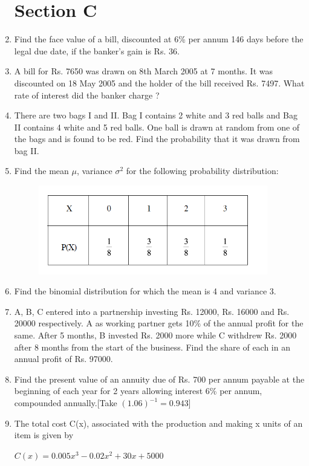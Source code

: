 \documentclass[journal,12pt,twocolumn]{IEEEtran}
\begin{document}
\begin{enumerate}
\section{Section C}
\medskip
\item Find the face value of a bill, discounted at 6\% per annum 146 days before the legal due date, if the banker's gain is Rs. 36.
\medskip
\item A bill for Rs. 7650 was drawn on 8th March 2005 at 7 months. It was discounted on 18 May 2005 and the holder of the bill received Rs. 7497. What rate of interest did the banker charge ?
\medskip
\item There are two bags I and II. Bag I contains 2 white and 3 red balls and Bag II contains 4 white and 5 red balls. One ball is drawn at random from one of the bags and is found to be red. Find the probability that it was drawn from bag II.
\medskip
\item Find the mean $\mu$, variance $\sigma^2$ for the following probability distribution:
\begin{figure}[H]
   \centering
   \includegraphics[width=10cm]{2.png}
\end{figure}
\item Find the binomial distribution for which the mean is 4 and variance 3.
\medskip
\item A, B, C entered into a partnership investing Rs. 12000, Rs. 16000 and
Rs. 20000 respectively. A as working partner gets 10\% of the annual profit for
the same. After 5 months, B invested Rs. 2000 more while C withdrew Rs. 2000
after 8 months from the start of the business. Find the share of each in an
annual profit of Rs. 97000.
\medskip
\item Find the present value of an annuity due of Rs. 700 per annum payable at the
beginning of each year for 2 years allowing interest 6\% per annum, compounded
annually.[Take $(1.06)^{-1} = 0.943$]
\medskip
\item The total cost C(x), associated with the production and making x units of an item is given by
\begin{center}
   $C(x) = 0.005x^3 - 0.02x^2 + 30x + 5000 $ 

\end{center}
\end{enumerate}
\end{document}
